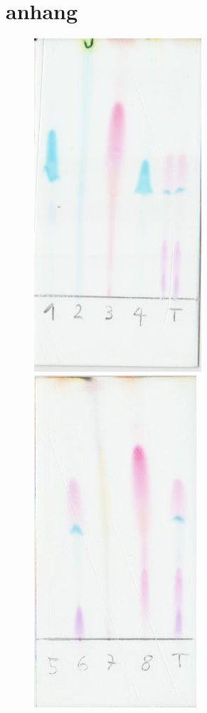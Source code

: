 \documentclass[11pt,paper=a4,final]{scrartcl}
\begin{document}
\section{anhang}
\begin{figure}[h!]
  \includegraphics{1-4}
  \includegraphics{5-8}

\end{figure}
\end{document}
